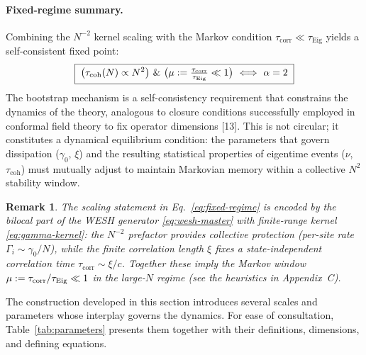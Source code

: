 \documentclass[12pt,a4paper]{article}
\newtheorem{remark}{Remark}[section]
\numberwithin{equation}{section}
\begin{document}
\paragraph{Fixed-regime summary.}
Combining the $N^{-2}$ kernel scaling with the Markov condition
$\tau_{\mathrm{corr}} \ll \tau_{\mathrm{Eig}}$ yields a self-consistent
fixed point:
\begin{equation}
\boxed{\;
\big(\tau_{\mathrm{coh}}(N)\propto N^2\big)\ \&\
\big(\mu:=\tfrac{\tau_{\mathrm{corr}}}{\tau_{\rm Eig}}\ll 1\big)
\ \Longleftrightarrow\ \alpha=2
\;}
\label{eq:fixed-regime}
\end{equation}
The bootstrap mechanism is a self-consistency requirement 
that constrains the dynamics of the theory, analogous to closure conditions 
successfully employed in conformal field theory to fix operator dimensions 
[13]. This is not circular; it constitutes a 
dynamical equilibrium condition: the parameters that govern dissipation 
($\gamma_0$, $\xi$) and the resulting statistical properties of eigentime 
events ($\nu$, $\tau_{\mathrm{coh}}$) must mutually adjust to maintain 
Markovian memory within a collective $N^2$ stability window.

\begin{remark}
The scaling statement in Eq.~\eqref{eq:fixed-regime} is encoded by the
bilocal part of the WESH generator \eqref{eq:wesh-master} with finite-range kernel
\eqref{eq:gamma-kernel}: the $N^{-2}$ prefactor provides collective
protection (per-site rate $\Gamma_i\!\sim\!\gamma_0/N$), while the finite
correlation length $\xi$ fixes a state-independent correlation time
$\tau_{\mathrm{corr}}\!\sim\!\xi/c$. Together these imply the Markov window
$\mu:=\tau_{\mathrm{corr}}/\tau_{\rm Eig}\ll 1$ in the large-$N$ regime
(see the heuristics in Appendix~C).
\end{remark}

\noindent The construction developed in this section introduces several 
scales and parameters whose interplay governs the dynamics. 
For ease of consultation, Table~\ref{tab:parameters} presents 
them together with their definitions, dimensions, and defining equations.
\end{document}

